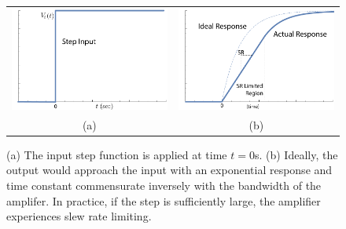 \begin{figure}[tb]
\begin{center}
\begin{tabular}{cc}
\includegraphics[width=.5\columnwidth]{step_input} &
\includegraphics[width=.5\columnwidth]{exp_slew} \\
(a) & (b) \\
\end{tabular}
\end{center}
\caption{(a) The input step function is applied at time $t=0$s.  (b) Ideally, the output would approach the input with an exponential response and time constant commensurate inversely with the bandwidth of the amplifer. In practice, if the step is sufficiently large, the amplifier experiences slew rate limiting.} \label{fig:step_input}
\end{figure}

